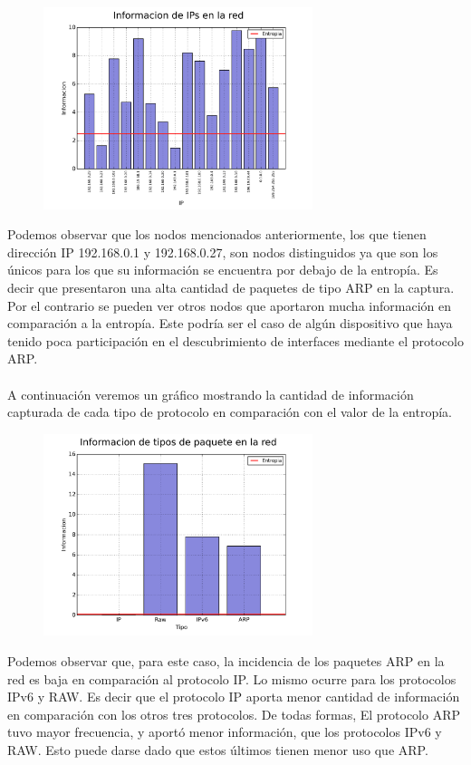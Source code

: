 \begin{figure}[ht!]
  \centering
   \includegraphics[width=0.7\textwidth]{graficos/domestica_network_information_bars_arp.png}
  \caption{}
  \label{fig:domestica_network_information_bars_arp}
\end{figure}

Podemos observar que los nodos mencionados anteriormente, los que tienen dirección IP 192.168.0.1 y 192.168.0.27, son nodos distinguidos ya que son los únicos para los que su información se encuentra por debajo de la entropía. Es decir que presentaron una alta cantidad de paquetes de tipo ARP en la captura. Por el contrario se pueden ver otros nodos que aportaron mucha información en comparación a la entropía. Este podría ser el caso de algún dispositivo que haya tenido poca participación en el descubrimiento de interfaces mediante el protocolo ARP.
\\\\
A continuación veremos un gráfico mostrando la cantidad de información capturada de cada tipo de protocolo en comparación con el valor de la entropía.

\begin{figure}[ht!]
  \centering
   \includegraphics[width=0.7\textwidth]{graficos/domestica_network_information_bars_type.png}
  \caption{}
  \label{fig:domestica_network_information_bars_type}
\end{figure}

Podemos observar que, para este caso, la incidencia de los paquetes ARP en la red es baja en comparación al protocolo IP. Lo mismo ocurre para los protocolos IPv6 y RAW. Es decir que el protocolo IP aporta menor cantidad de información en comparación con los otros tres protocolos. De todas formas, El protocolo ARP tuvo mayor frecuencia, y aportó menor información, que los protocolos IPv6 y RAW. Esto puede darse dado que estos últimos tienen menor uso que ARP.